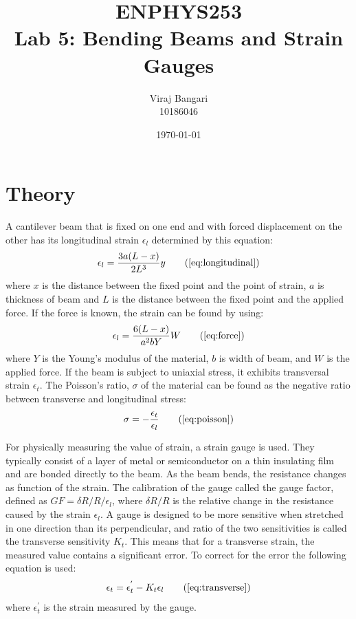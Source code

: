 \documentclass[]{article}
\title{ENPHYS253 \\ Lab 5: Bending Beams and Strain Gauges}
\author{Viraj Bangari \\ 10186046}
\date{\today}
\begin{document}
 
\maketitle

\section{Theory}
A cantilever beam that is fixed on one end and with forced displacement on the
other has its longitudinal strain $\epsilon_l$ determined by this equation:
\begin{equation}
    \epsilon_l = \frac{3a(L-x)}{2L^3}y \tag{\ref{eq:longitudinal}}
\end{equation}
where $x$ is the distance between the fixed point and the point of strain, $a$
is thickness of beam and $L$ is the distance between the
fixed point and the applied force. If the force is known, the strain can be found by
using:
\begin{equation}
    \epsilon_l = \frac{6(L-x)}{a^2bY}W \tag{\ref{eq:force}}
\end{equation}
where $Y$ is the Young's modulus of the material, $b$ is width of beam, and $W$
is the applied force.  If the beam is subject to uniaxial stress, it exhibits
transversal strain $\epsilon_t$. The Poisson's ratio, $\sigma$ of the material
can be found as the negative ratio between transverse and longitudinal stress:
\begin{equation}
    \sigma = -\frac{\epsilon_t}{\epsilon_l} \tag{\ref{eq:poisson}}
\end{equation}

For physically measuring the value of strain, a strain gauge is used. They
typically consist of a layer of metal or semiconductor on a thin insulating film
and are bonded directly to the beam. As the beam bends, the resistance changes
as function of the strain. The calibration of the gauge called the gauge factor,
defined as $GF = \delta R/R/\epsilon_l$, where $\delta R/R$ is the relative
change in the resistance caused by the strain $\epsilon_l$. A gauge is designed
to be more sensitive when stretched in one direction than its perpendicular, and
ratio of the two sensitivities is called the transverse sensitivity $K_t$. This
means that for a transverse strain, the measured value contains a significant
error. To correct for the error the following equation is used:
\begin{equation}
    \epsilon_t = \epsilon_t^{'} - K_t\epsilon_l \tag{\ref{eq:transverse}}
\end{equation}
where $\epsilon_t^{'}$ is the strain measured by the gauge.
\end{document}
